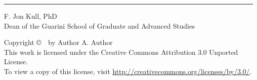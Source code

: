 \begin{titlepage}
\begin{minipage}[b]{\linewidth}
    \begin{flushleft}
        \vspace*{-0.44in}
        \singlespacing
        \begin{minipage}[b]{0.45\linewidth}
            \hrule \vspace{0.1in}
            F. Jon Kull, PhD \\              %
            Dean of the Guarini School of Graduate and Advanced Studies
        \end{minipage}
    \end{flushleft}
    
 \end{minipage}
 
\end{titlepage}


\newpage
\thispagestyle{empty}
\begin{center}
    \vspace*{\fill}
    Copyright \copyright\ \the\year\ by Author A. Author \\ 
    This work is licensed under the Creative Commons Attribution 3.0 Unported License. \\
    To view a copy of this license, visit \url{http://creativecommons.org/licenses/by/3.0/}.
    \vspace*{\fill}
\end{center}

\newpage


\newpage
{}


{
    \newpage
    \hypersetup{linkcolor=black}
    \tableofcontents
    
    \newpage
    \listoftables

    \newpage
    \listoffigures
}
